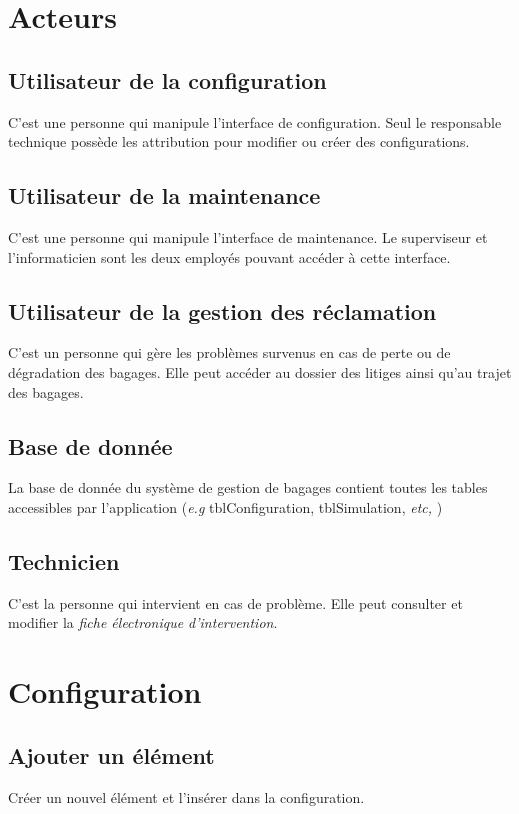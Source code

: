 \section{Acteurs}
\subsection{Utilisateur de la configuration}
C'est une personne qui manipule l'interface de configuration. Seul le responsable technique possède les attribution pour modifier ou créer des configurations.

\subsection{Utilisateur de la maintenance}
C'est une personne qui manipule l'interface de maintenance. Le superviseur et l'informaticien sont les deux employés pouvant accéder à cette interface.

\subsection{Utilisateur de la gestion des réclamation}
C'est un personne qui gère les problèmes survenus en cas de perte ou de dégradation des bagages. Elle peut accéder au dossier des litiges ainsi qu'au trajet des bagages.

\subsection{Base de donnée}
La base de donnée du système de gestion de bagages contient toutes les tables accessibles par l'application (\textsl{e.g} tblConfiguration, tblSimulation, \textsl{etc,} )

\subsection{Technicien}
C'est la personne qui intervient en cas de problème. Elle peut consulter et modifier la \textsl{fiche électronique d'intervention}.

\section{Configuration}
\subsection{Ajouter un élément}
Créer un nouvel élément et l'insérer dans la configuration. 

